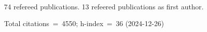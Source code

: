 74 refereed publications. 13 refeered publications as first author.

Total citations~=~4550; h-index~=~36 (2024-12-26)